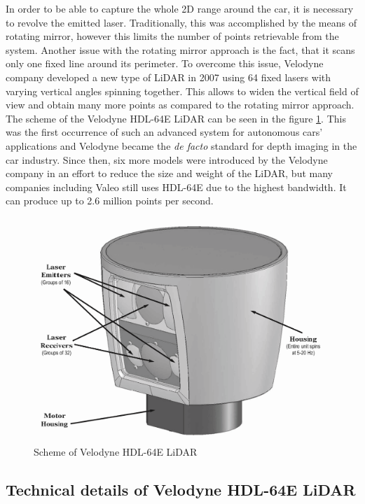 In order to be able to capture the whole 2D range around the car, it is necessary to revolve the emitted laser. Traditionally, this was accomplished by the means of rotating mirror, however this limits the number of points retrievable from the system. Another issue with the rotating mirror approach is the fact, that it scans only one fixed line around its perimeter. To overcome this issue, Velodyne company developed a new type of LiDAR in 2007 using 64 fixed lasers with varying vertical angles spinning together. This allows to widen the vertical field of view and obtain many more points as compared to the rotating mirror approach. The scheme of the Velodyne HDL-64E LiDAR can be seen in the figure \ref{lidarscheme}. This was the first occurrence of such an advanced system for autonomous cars' applications and Velodyne became the {\em de facto} standard for depth imaging in the car industry. Since then, six more models were introduced by the Velodyne company in an effort to reduce the size and weight of the LiDAR, but many companies including Valeo still uses HDL-64E due to the highest bandwidth. It can produce up to 2.6 million points per second.

\begin{figure}
\centering
\includegraphics[keepaspectratio,width=0.98\textwidth]{img/lidar.png}
\caption{Scheme of Velodyne HDL-64E LiDAR}
\label{lidarscheme}
\end{figure}

\subsection{Technical details of Velodyne HDL-64E LiDAR}

